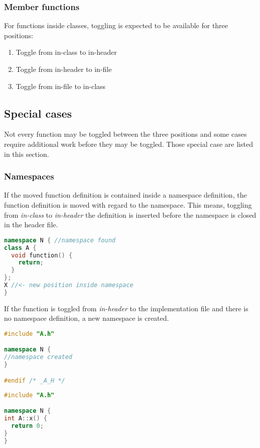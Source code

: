 \subsubsection{Member functions}
For functions inside classes, toggling is expected to be available for three 
positions:
\begin{enumerate}
\item Toggle from in-class to in-header
\item Toggle from in-header to in-file
\item Toggle from in-file to in-class
\end{enumerate}

\subsection{Special cases}

Not every function may be toggled between the three positions and some cases 
require additional work before they may be toggled. Those special case are 
listed in this section.

\subsubsection{Namespaces}

If the moved function definition is contained inside a namespace definition,
the function definition is moved with regard to the namespace. This means,
toggling from \textit{in-class} to \textit{in-header} the definition is
inserted before the namespace is closed in the header file.

\begin{lstlisting}[caption={A.cpp},label={twofilesolution_impl},language=C++]
namespace N { //namespace found
class A {
  void function() {
    return;
  }
};
X //<- new position inside namespace
}
\end{lstlisting}

If the function is toggled from \textit{in-header} to the implementation file
and there is no namespace definition, a new namespace is created.

\vspace{0.5cm}
\begin{minipage}{.48\textwidth}
\lstset{xrightmargin=0.5cm}
\begin{lstlisting}[caption={A.cpp,new namespace created},
label={addnamespace1}, language=C++]
#include "A.h"

namespace N {
//namespace created
}

#endif /* _A_H */
\end{lstlisting}
\end{minipage}%
\begin{minipage}{.48\textwidth}
\lstset{xleftmargin=0.5cm}
\begin{lstlisting}[caption={A.cpp,insterted func.},
label={addnamespace2},language=C++]
#include "A.h"

namespace N {
int A::x() { 
  return 0;
}
}
\end{lstlisting}
\end{minipage}

